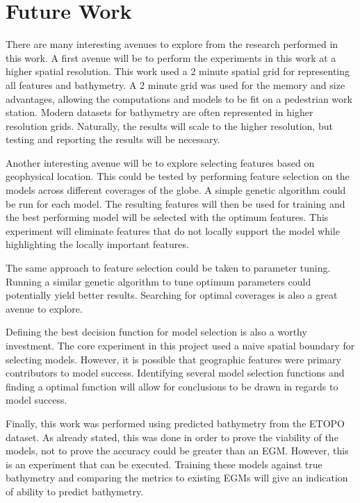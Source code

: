 \section{Future Work}
\setlength{\parindent}{10ex}
There are many interesting avenues to explore from the research performed in this work.
A first avenue will be to perform the experiments in this work at a higher spatial resolution.
This work used a 2 minute spatial grid for representing all features and bathymetry.
A 2 minute grid was used for the memory and size advantages, allowing the computations and models to be fit on a pedestrian work station.
Modern datasets for bathymetry are often represented in higher resolution grids.
Naturally, the results will scale to the higher resolution, but testing and reporting the results will be necessary.

\par
Another interesting avenue will be to explore selecting features based on geophysical location.
This could be tested by performing feature selection on the models across different coverages of the globe.
A simple genetic algorithm could be run for each model.
The resulting features will then be used for training and the best performing model will be selected with the optimum features.
This experiment will eliminate features that do not locally support the model while highlighting the locally important features.

\par
The same approach to feature selection could be taken to parameter tuning.
Running a similar genetic algorithm to tune optimum parameters could potentially yield better results.
Searching for optimal coverages is also a great avenue to explore.

\par 
Defining the best decision function for model selection is also a worthy investment.
The core experiment in this project used a naive spatial boundary for selecting models.
However, it is possible that geographic features were primary contributors to model success.
Identifying several model selection functions and finding a optimal function will allow for conclusions to be drawn in regards to model success.

\par
Finally, this work was performed using predicted bathymetry from the ETOPO dataset.
As already stated, this was done in order to prove the viability of the models, not to prove the accuracy could be greater than an \ac{EGM}.
However, this is an experiment that can be executed.
Training these models against true bathymetry and comparing the metrics to existing \ac{EGM}s will give an indication of ability to predict bathymetry.